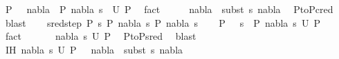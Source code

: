\begin{isabellebody}
\ {\isachardoublequoteopen}P{}\ \ {\isasymturnstile}\ nabla{}\ {\isasymrightarrow}\ P{}{\isachardoublequoteclose}\ {\isachardoublequoteopen}{\isacharparenleft}{\kern0pt}nabla{}{\isacharcomma}{\kern0pt}\ s{}{\isacharparenright}{\kern0pt}\ {\isasymin}\ U\ P{}{\isachardoublequoteclose}\ \isamarkupfalse%
\ fact{\isacharplus}{\kern0pt}\isanewline
\ \ \isamarkupfalse%
\ \isamarkupfalse%
\ {\isachardoublequoteopen}nabla{}\ {\isasymTurnstile}\ {\isacharparenleft}{\kern0pt}subst\ s{}{\isacharparenright}{\kern0pt}\ nabla{}{\isachardoublequoteclose}\ \isamarkupfalse%
\ P{}{\isacharunderscore}{\kern0pt}to{\isacharunderscore}{\kern0pt}P{}{\isacharunderscore}{\kern0pt}cred\ \isamarkupfalse%
\ blast\isanewline
{}\isamarkupfalse%
\isanewline
\ \ \isamarkupfalse%
\ {\isacharparenleft}{\kern0pt}sred{\isacharunderscore}{\kern0pt}step\ P{}\ s\ P{}\ nabla{}\ s{}\ P{}\ nabla{}\ s{}{\isacharparenright}{\kern0pt}\isanewline
\ \ \isamarkupfalse%
\ {\isachardoublequoteopen}P{}\ \ {\isasymturnstile}\ s\ {\isasymleadsto}\ P{}{\isachardoublequoteclose}\ {\isachardoublequoteopen}{\isacharparenleft}{\kern0pt}nabla{}{\isacharcomma}{\kern0pt}\ s{}{\isacharparenright}{\kern0pt}{\isasymin}\ U\ P{}{\isachardoublequoteclose}\ \isamarkupfalse%
\ fact{\isacharplus}{\kern0pt}\ \isanewline
\ \ \isamarkupfalse%
\ \isamarkupfalse%
\ {\isachardoublequoteopen}{\isacharparenleft}{\kern0pt}nabla{}{\isacharcomma}{\kern0pt}\ s{}{\isacharparenright}{\kern0pt}{\isasymin}\ U\ P{}{\isachardoublequoteclose}\ \isamarkupfalse%
\ P{}{\isacharunderscore}{\kern0pt}to{\isacharunderscore}{\kern0pt}P{}{\isacharunderscore}{\kern0pt}sred\ \isamarkupfalse%
\ blast\ \isanewline
\ \ \isamarkupfalse%
\ \isamarkupfalse%
\ IH{\isacharcolon}{\kern0pt}\ {\isachardoublequoteopen}{\isacharparenleft}{\kern0pt}nabla{}{\isacharcomma}{\kern0pt}\ s{}{\isacharparenright}{\kern0pt}{\isasymin}\ U\ P{}\ {\isasymLongrightarrow}\ \ nabla{}\ {\isasymTurnstile}\ {\isacharparenleft}{\kern0pt}subst\ s{}{\isacharparenright}{\kern0pt}\ nabla{}{\isachardoublequoteclose}\ \isamarkupfalse%

\end{isabellebody}
